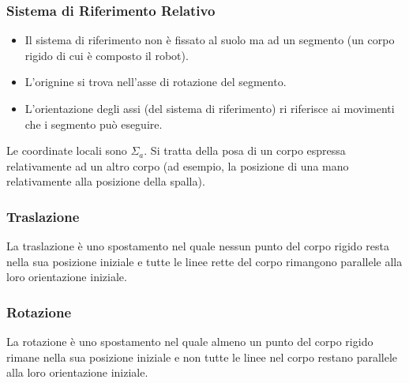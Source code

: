\documentclass[a4paper,portrait,12pt]{article}
\theoremstyle{definition}
\begin{document}
\subsubsection{Sistema di Riferimento Relativo}

\begin{itemize}
\item Il sistema di riferimento non è fissato al suolo ma ad un segmento (un corpo rigido di cui è composto il robot).
\item L'orignine si trova nell'asse di rotazione del segmento.
\item L'orientazione degli assi (del sistema di riferimento) ri riferisce ai movimenti che i segmento può eseguire.
\end{itemize}
Le coordinate locali sono $\Sigma_a$.
Si tratta della posa di un corpo espressa relativamente ad un altro corpo (ad esempio, la posizione di una mano relativamente alla posizione della spalla).

\subsubsection{Traslazione}

La traslazione è uno spostamento nel quale nessun punto del corpo rigido resta nella sua posizione iniziale e tutte le linee rette del corpo rimangono parallele alla loro orientazione iniziale. 

\subsubsection{Rotazione}

La rotazione è uno spostamento nel quale almeno un punto del corpo rigido rimane nella sua posizione iniziale e non tutte le linee nel corpo restano parallele alla loro orientazione iniziale.\\
\end{document}
